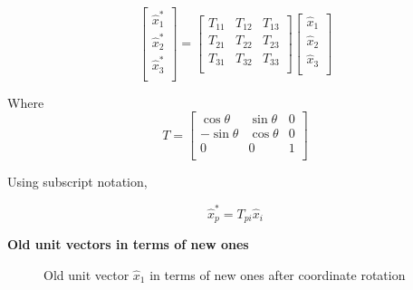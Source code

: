 \begin{equation*}
\left[ 
\begin{array}{l}
\hat{x}_1^*  \\
\hat{x}_2^* \\
\hat{x}_3^*  \\
\end{array}
\right] 
= \left[ 
\begin{array}{lll}
 T_{11}  &  T_{12}  & T_{13}\\
 T_{21}  &  T_{22}  & T_{23}\\
 T_{31}  &  T_{32}  & T_{33}\\
\end{array}
\right] 
\left[ 
\begin{array}{l}
\hat{x}_1 \\
\hat{x}_2 \\
\hat{x}_3 \\
\end{array}
\right]
\end{equation*}

Where
\begin{equation*}
T 
= \left[ 
\begin{array}{lll}
 \cos\theta  &  \sin\theta  & 0\\
 -\sin\theta &  \cos\theta  & 0 \\
  0 & 0 & 1\\
\end{array}
\right] 
\end{equation*}

Using subscript notation,

$$ \hat{x}^*_p = T_{pi} \hat{x}_i $$

{\bf Old unit vectors in terms of new ones}

\begin{figure}[h]
\begin{center}
\end{center}
\caption{Old unit vector $\hat{x}_1$ in terms of new ones after coordinate rotation}
\label{rotationofaxes5}
\end{figure}



